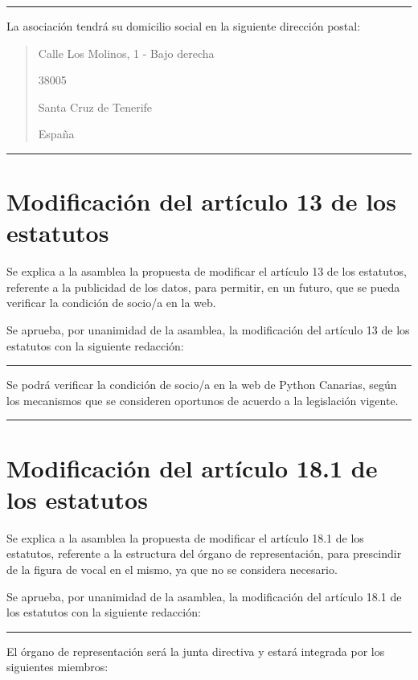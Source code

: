\documentclass[a4paper, 12pt]{article}
\begin{document}
\hrule
\vspace{3mm}

La asociación tendrá su domicilio social en la siguiente dirección postal:

\begin{quotation}
    Calle Los Molinos, 1 - Bajo derecha

    38005

    Santa Cruz de Tenerife

    España
\end{quotation}
\hrule

\section{Modificación del artículo 13 de los estatutos}

Se explica a la asamblea la propuesta de modificar el artículo 13 de los estatutos, referente a la publicidad de los datos, para permitir, en un futuro, que se pueda verificar la condición de socio/a en la web.

Se aprueba, por unanimidad de la asamblea, la modificación del artículo 13 de los estatutos con la siguiente redacción:\\

\hrule
\vspace{3mm}

Se podrá verificar la condición de socio/a en la web de Python Canarias, según los mecanismos que se consideren oportunos de acuerdo a la legislación vigente.

\vspace{3mm}
\hrule

\section{Modificación del artículo 18.1 de los estatutos}

Se explica a la asamblea la propuesta de modificar el artículo 18.1 de los estatutos, referente a la estructura del órgano de representación, para prescindir de la figura de vocal en el mismo, ya que no se considera necesario.

Se aprueba, por unanimidad de la asamblea, la modificación del artículo 18.1 de los estatutos con la siguiente redacción:\\

\hrule
\vspace{3mm}

El órgano de representación será la junta directiva y estará integrada por los siguientes miembros:
\end{document}
